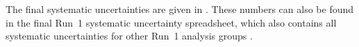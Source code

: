 The final systematic uncertainties are given in . These numbers can also be found in the final Run~1 systematic uncertainty spreadsheet, which also contains all systematic uncertainties for other Run~1 analysis groups \cite{UncertaintySpreadsheet}.








